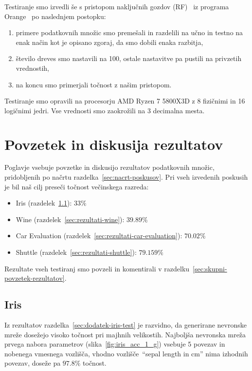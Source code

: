 \documentclass[a4paper,12pt,openright]{book}
\begin{document}
    Testiranje smo izvedli še s pristopom naključnih gozdov (RF)~\cite{inteligentni_sistemi_2010} iz programa Orange~\cite{JMLR:demsar13a} po naslednjem postopku:
    \begin{enumerate}
        \item primere podatkovnih množic smo premešali in razdelili na učno in testno na enak način kot je opisano zgoraj,
        da smo dobili enaka razbitja,
        \item število dreves smo nastavili na 100, ostale nastavitve pa pustili na privzetih vrednostih,
        \item na koncu smo primerjali točnost z našim pristopom.
    \end{enumerate}

    Testiranje smo opravili na procesorju AMD Ryzen 7 5800X3D z 8 fizičnimi in 16 logičnimi jedri.
    Vse vrednosti smo zaokrožili na 3 decimalna mesta.


    \chapter{Povzetek in diskusija rezultatov}\label{ch:rezultati}
    Poglavje vsebuje povzetke in diskusijo rezultatov podatkovnih množic, pridobljenih po načrtu razdelka~\ref{sec:nacrt-poskusov}.
    Pri vseh izvedenih poskusih je bil naš cilj preseči točnost večinskega razreda:
    \begin{itemize}
        \item{Iris (razdelek~\ref{sec:rezultati-iris}): $33\%$}
        \item{Wine (razdelek~\ref{sec:rezultati-wine}): $39.89\%$}
        \item{Car Evaluation (razdelek~\ref{sec:rezultati-car-evaluation}): $70.02\%$}
        \item{Shuttle (razdelek~\ref{sec:rezultati-shuttle}): $79.159\%$}
    \end{itemize}

    Rezultate vseh testiranj smo povzeli in komentirali v razdelku~\ref{sec:skupni-povzetek-rezultatov}.

    \section{Iris}\label{sec:rezultati-iris}
    Iz rezultatov razdelka~\ref{sec:dodatek-iris-test} je razvidno, da generirane nevronske mreže do\-se\-že\-jo visoko točnost pri majhnih velikostih.
    Najboljša nevronska mreža prvega nabora parametrov (slika~\ref{fig:iris_acc_1_g}) vsebuje 5 povezav in nobenega vmesnega vozlišča,
    vhodno vozlišče~\enquote{sepal length in cm} nima izhodnih povezav, doseže pa $97.8\%$ točnost.
\end{document}
